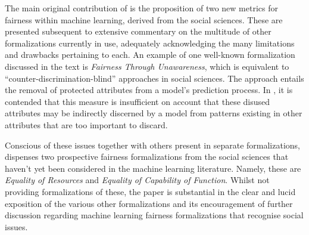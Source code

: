\documentclass[a4paper]{IEEEtran}
\begin{document}
The main original contribution of \cite{b1} is the proposition of two new metrics for fairness within machine learning, derived from the social sciences. These are presented subsequent to extensive commentary on the multitude of other formalizations currently in use, adequately acknowledging the many limitations and drawbacks pertaining to each. An example of one well-known formalization discussed in the text is \textit{Fairness Through Unawareness}, which is equivalent to ``counter-discrimination-blind'' approaches in social sciences. The approach entails the removal of protected attributes from a model's prediction process. In \cite{unawareness}, it is contended that this measure is insufficient on account that these disused attributes may be indirectly discerned by a model from patterns existing in other attributes that are too important to discard. 

Conscious of these issues together with others present in separate formalizations, \cite{b1} dispenses two prospective fairness formalizations from the social sciences that haven't yet been considered in the machine learning literature. Namely, these are \textit{Equality of Resources} and \textit{Equality of Capability of Function}. Whilst not providing formalizations of these, the paper is substantial in the clear and lucid exposition of the various other formalizations and its encouragement of further discussion regarding machine learning fairness formalizations that recognise social issues.




\end{document}
